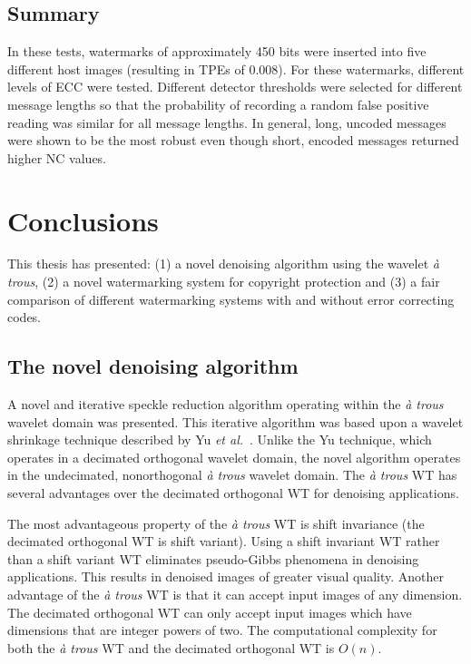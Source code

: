 \documentclass[12pt]{report}
\begin{document}
\section{Summary}
In these tests, watermarks of approximately 450 bits were 
inserted into five different host images (resulting in TPEs of 0.008).
For these watermarks, different levels of ECC were tested. 
Different detector thresholds were selected for different message lengths so
that the probability of recording a random false positive reading was similar for all message lengths.
In general, long, uncoded messages were shown to be the most robust even though short, encoded messages returned
higher NC values.


\chapter{Conclusions}
\label{ch:finalConc}

This thesis has presented: (1) a novel denoising algorithm using the wavelet \emph{\`a trous},
(2) a novel watermarking system for copyright protection and 
(3) a fair comparison of different watermarking systems with and without error
correcting codes.

\section{The novel denoising algorithm}
A novel and iterative speckle reduction algorithm operating within the \emph{\`a trous} wavelet domain was presented.
This iterative algorithm was based upon a wavelet shrinkage technique described by Yu \emph{et al.}~\cite{yu96}. 
Unlike the Yu technique, which operates in a decimated orthogonal wavelet domain, the novel algorithm operates
in the undecimated, nonorthogonal \emph{\`a trous} wavelet domain.
The \emph{\`a trous} WT has several advantages over the decimated orthogonal WT for denoising applications.

The most advantageous property of the \emph{\`a trous} WT is shift invariance (the decimated orthogonal WT is shift variant).
Using a shift invariant WT rather than a shift variant WT eliminates pseudo-Gibbs phenomena in denoising applications.
This results in denoised images of greater visual quality. 
Another advantage of the \emph{\`a trous} WT is that it can accept input images of any dimension. 
The decimated orthogonal WT can only accept input images which have dimensions that are integer powers of two.
The computational complexity for both the \emph{\`a trous} WT and the decimated orthogonal WT is $O(n)$.
\end{document}

